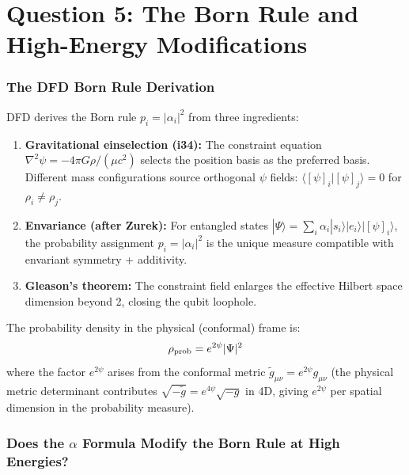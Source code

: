 \documentclass[12pt,a4paper]{article}
\begin{document}
\part{Question 5: The Born Rule and High-Energy Modifications}
\label{part:q5}

\section{The DFD Born Rule Derivation}

DFD derives the Born rule $p_i = |\alpha_i|^2$ from three ingredients:

\begin{enumerate}
\item \textbf{Gravitational einselection (i34):} The constraint equation $\nabla^2\psi = -4\pi G\rho/(\mu c^2)$ selects the position basis as the preferred basis. Different mass configurations source orthogonal $\psi$ fields: $\langle[\psi]_i|[\psi]_j\rangle = 0$ for $\rho_i \neq \rho_j$.

\item \textbf{Envariance (after Zurek):} For entangled states $|\Psi\rangle = \sum_i \alpha_i |s_i\rangle|e_i\rangle|[\psi]_i\rangle$, the probability assignment $p_i = |\alpha_i|^2$ is the unique measure compatible with envariant symmetry + additivity.

\item \textbf{Gleason's theorem:} The constraint field enlarges the effective Hilbert space dimension beyond 2, closing the qubit loophole.
\end{enumerate}

The probability density in the physical (conformal) frame is:
\begin{equation}
\rho_{\rm prob} = e^{2\psi}|\Psi|^2
\label{eq:born-dfd}
\end{equation}
where the factor $e^{2\psi}$ arises from the conformal metric $\tilde{g}_{\mu\nu} = e^{2\psi}g_{\mu\nu}$ (the physical metric determinant contributes $\sqrt{-\tilde{g}} = e^{4\psi}\sqrt{-g}$ in 4D, giving $e^{2\psi}$ per spatial dimension in the probability measure).

\section{Does the $\alpha$ Formula Modify the Born Rule at High Energies?}
\end{document}

